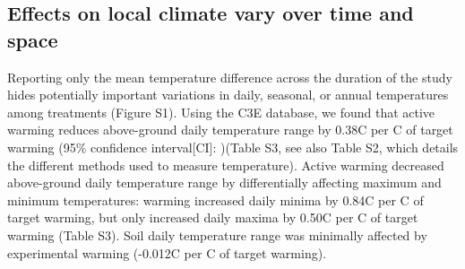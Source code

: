 \documentclass{article}
\begin{document}
\subsection* {Effects on local climate vary over time and space}
Reporting only the mean temperature difference across the duration of the study hides potentially important variations in daily, seasonal, or annual temperatures among treatments (Figure S1). Using the C3E database, we found that active warming reduces above-ground daily temperature range by 0.38\degree C per \degree C of target warming (95\% confidence interval[CI]: )(Table S3, see also Table S2, which details the different methods used to measure temperature). Active warming decreased above-ground daily temperature range by differentially affecting maximum and minimum temperatures: warming increased daily minima by 0.84\degree C per \degree C of target warming, but only increased daily maxima by 0.50\degree C per \degree C of target warming (Table S3). Soil daily temperature range was minimally affected by experimental warming (-0.012\degree C per \degree C of target warming).%

\end{document}
